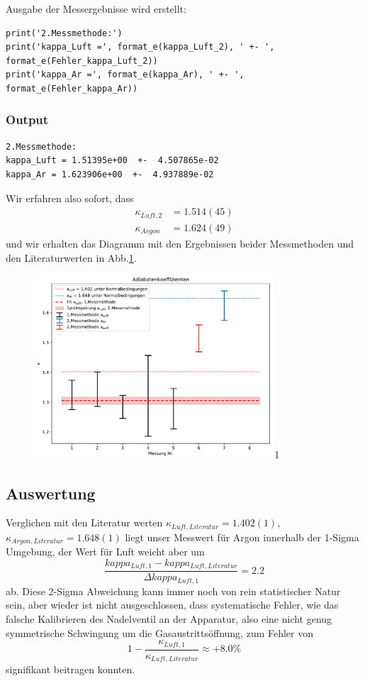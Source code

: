 \documentclass[a4paper,10pt]{article}
\begin{document}
Ausgabe der Messergebnisse wird erstellt:\begin{lstlisting}
print('2.Messmethode:')
print('kappa_Luft =', format_e(kappa_Luft_2), ' +- ', format_e(Fehler_kappa_Luft_2))
print('kappa_Ar =', format_e(kappa_Ar), ' +- ', format_e(Fehler_kappa_Ar))

\end{lstlisting}

\subsubsection{Output}
\begin{lstlisting}
2.Messmethode:
kappa_Luft = 1.51395e+00  +-  4.507865e-02
kappa_Ar = 1.623906e+00  +-  4.937889e-02

\end{lstlisting}
Wir erfahren also sofort, dass
\begin{align*}
\kappa_{Luft,2}&=1.514(45)\\
\kappa_{Argon}&=1.624(49)
\end{align*}
und wir erhalten das Diagramm mit den Ergebnissen beider Messmethoden und den Literaturwerten in Abb.\ref{fig:Fig1}.

\begin{figure}[htb]
  \centering
  \begin{annotate}{\includegraphics[width=0.8\textwidth]{221_Fig1.pdf}}{1}
  \end{annotate}
\caption{}
\label{fig:Fig1}
\end{figure}
\subsection{Auswertung}
Verglichen mit den Literatur werten \(\kappa_{Luft,Literatur}=1.402(1)\), \(\kappa_{Argon,Literatur}=1.648(1)\) liegt unser Messwert für Argon innerhalb der 1-Sigma Umgebung, der Wert für Luft weicht aber um  \[\frac{{kappa_{Luft,1}}-{kappa_{Luft,Literatur}}}{\Delta {kappa_{Luft,1}}}=2 .2\] ab. Diese 2-Sigma Abweichung kann immer noch von rein  statistischer Natur sein, aber wieder ist nicht ausgeschlossen, dass systematische Fehler, wie das falsche Kalibrieren des Nadelventil an der Apparatur, also eine nicht genug symmetrische Schwingung um die Gasaustrittsöffnung, zum Fehler von 
\[1- \frac{{\kappa_{Luft,1}}}{\kappa_{Luft,Literatur}}\approx +8.0\%\] 
signifikant beitragen konnten.
\end{document}
